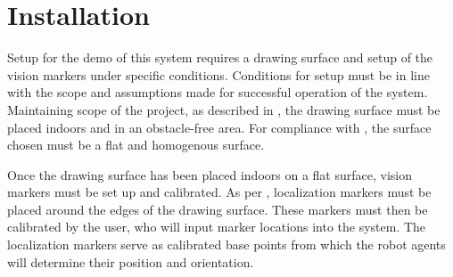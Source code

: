 
\section{Installation}
\label{sec:install}
Setup for the demo of this system requires a drawing surface and setup of the vision markers under specific conditions. Conditions for setup must be in line with the scope and assumptions made for successful operation of the system. Maintaining scope of the project, as described in , the drawing surface must be placed indoors and in an obstacle-free area. For compliance with , the surface chosen must be a flat and homogenous surface.

Once the drawing surface has been placed indoors on a flat surface, vision markers must be set up and calibrated. As per , localization markers must be placed around the edges of the drawing surface. These markers must then be calibrated by the user, who will input marker locations into the system. The localization markers serve as calibrated base points from which the robot agents will determine their position and orientation.
